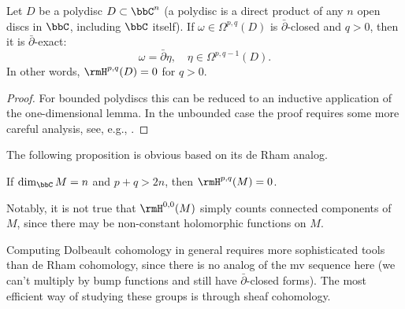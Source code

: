 \begin{thm} Let $D$ be a polydisc $D\subset \bbC^n$ (a polydisc is a direct product of any $n$ open discs in $\bbC$, including $\bbC$ itself). If $\omega\in\Omega^{p,q}(D)$ is $\bar\partial$-closed and $q>0$, then it is $\bar\partial$-exact:
    \[\omega=\bar\partial\eta,\quad \eta\in\Omega^{p,q-1}(D).\]
    In other words, $\rmH^{p,q}(D)=0$ for $q>0$.
\end{thm}
\begin{proof}
    For bounded polydiscs this can be reduced to an inductive application of the one-dimensional lemma. In the unbounded case the proof requires some more careful analysis, see, e.g., \cite[Prop.\ 1.3.8 and Cor.\ 1.3.9]{Huybrechts}.
\end{proof}

The following proposition is obvious based on its de Rham analog.

\begin{prop}
    If $\dim_\bbC M=n$ and $p+q>2n$, then $\rmH^{p,q}(M)=0$.
\end{prop}

Notably, it is not true that $\rmH^{0,0}(M)$ simply counts connected components of $M$, since there may be non-constant holomorphic functions on $M$.

Computing Dolbeault cohomology in general requires more sophisticated tools than de Rham cohomology, since there is no analog of the \gls{mv} sequence here (we can't multiply by bump functions and still have $\bar\partial$-closed forms). The most efficient way of studying these groups is through sheaf cohomology.


